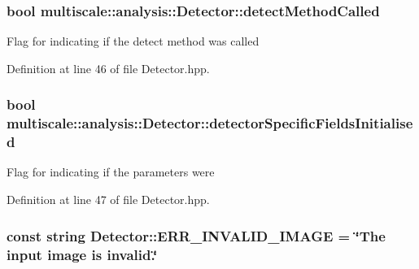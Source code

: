 \hypertarget{classmultiscale_1_1analysis_1_1Detector_ad565f471d9d7db7692da588ff0d6be2f}{
\subsubsection[{detect\-Method\-Called}]{\setlength{\rightskip}{0pt plus 5cm}bool {\bf multiscale\-::analysis\-::\-Detector\-::detect\-Method\-Called}}}\label{classmultiscale_1_1analysis_1_1Detector_ad565f471d9d7db7692da588ff0d6be2f}
\-Flag for indicating if the detect method was called 

\-Definition at line 46 of file \-Detector.\-hpp.

\hypertarget{classmultiscale_1_1analysis_1_1Detector_a172b91067670a14a7707f24dc218f2af}{
\subsubsection[{detector\-Specific\-Fields\-Initialised}]{\setlength{\rightskip}{0pt plus 5cm}bool {\bf multiscale\-::analysis\-::\-Detector\-::detector\-Specific\-Fields\-Initialised}}}\label{classmultiscale_1_1analysis_1_1Detector_a172b91067670a14a7707f24dc218f2af}
\-Flag for indicating if the parameters were 

\-Definition at line 47 of file \-Detector.\-hpp.

\hypertarget{classmultiscale_1_1analysis_1_1Detector_aa5dc8982745f567379e0eccd416c6820}{
\subsubsection[{\-E\-R\-R\-\_\-\-I\-N\-V\-A\-L\-I\-D\-\_\-\-I\-M\-A\-G\-E}]{\setlength{\rightskip}{0pt plus 5cm}const string {\bf \-Detector\-::\-E\-R\-R\-\_\-\-I\-N\-V\-A\-L\-I\-D\-\_\-\-I\-M\-A\-G\-E} = \char`\"{}\-The input {\bf image} is invalid.\char`\"{}}}\label{classmultiscale_1_1analysis_1_1Detector_aa5dc8982745f567379e0eccd416c6820}


